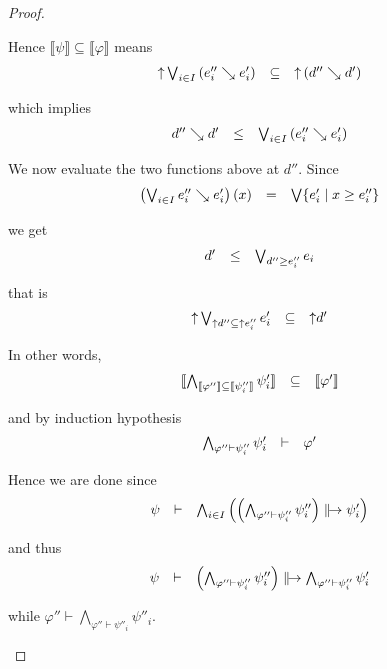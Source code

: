 \documentclass[%
  a4paper,
  UKenglish,
  cleveref,
  autoref,
  thm-restate,
  numberwithinsect,
]{lipics-v2021}
\newcommand\sle\subseteq
\newcommand\thesis{\vdash}
\newcommand\up{\mathord{\uparrow}}
\newcommand\I[1]{\llbracket #1 \rrbracket} %
\newcommand\defrealto{\mathrel\parallel\joinrel\to}
\newcommand\realto{\mathrel{\defrealto}}
\newcommand\step{\searrow}
\begin{document}
\begin{proof}
\begin{description}
Hence $\I\psi \sle \I\varphi$ means
\[
\begin{array}{l l l}
  \up \bigvee_{i \in I} \left(e''_i \step e'_i \right)
& \sle
& \up \left( d'' \step d' \right)
\end{array}
\]

\noindent
which implies
\[
\begin{array}{l l l}
  d'' \step d'
& \leq
& \bigvee_{i \in I} \left(e''_i \step e'_i \right)
\end{array}
\]

\noindent
We now evaluate the two functions above at $d''$.
Since
\[
\begin{array}{l l l}
  \left( \bigvee_{i \in I} e''_i \step e'_i \right)(x)
& =
& \bigvee \{ e'_i \mid x \geq e''_i\}
\end{array}
\]

\noindent
we get
\[
\begin{array}{l l l}
  d'
& \leq
& \bigvee_{d'' \geq e''_i} e_i
\end{array}
\]

\noindent
that is
\[
\begin{array}{l l l}
  \up \bigvee_{\up d'' \sle \up e''_i} e'_i
& \sle
& \up d'
\end{array}
\]

\noindent
In other words,
\[
\begin{array}{l l l}
  \I{\bigwedge_{\I{\varphi''} \sle \I{\psi ''_i}} \psi'_i}
& \sle
& \I{\varphi'}
\end{array}
\]

\noindent
and by induction hypothesis
\[
\begin{array}{l l l}
  \bigwedge_{\varphi'' \thesis \psi ''_i} \psi'_i
& \thesis
& \varphi'
\end{array}
\]

Hence we are done since
\[
\begin{array}{l l l}
  \psi
& \thesis
& \bigwedge_{i \in I} \left(
  \left( \bigwedge_{\varphi'' \thesis \psi ''_i} \psi''_i \right)
  \realto
  \psi'_i
  \right)
\end{array}
\]

\noindent
and thus
\[
\begin{array}{l l l}
  \psi
& \thesis
& \left( \bigwedge_{\varphi'' \thesis \psi ''_i} \psi''_i \right)
  \realto
  \bigwedge_{\varphi'' \thesis \psi ''_i} \psi'_i
\end{array}
\]

\noindent
while
\(
\varphi'' \thesis \bigwedge_{\varphi'' \thesis \psi ''_i} \psi''_i
\).
\qedhere
\end{description}
\end{proof}
\end{document}
